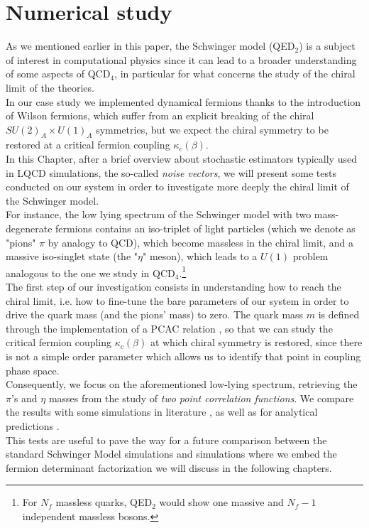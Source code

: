 \chapter{Numerical study}
\label{chap: Std Schwinger Model}

As we mentioned earlier in this paper, the Schwinger model (QED$_2$) is a subject of interest in computational physics since it can lead to a broader understanding of some aspects of QCD$_4$, in particular for what concerns the study of the chiral limit of the theories. 
\\ In our case study we implemented dynamical fermions thanks to the introduction of Wilson fermions, which suffer from an explicit breaking of the chiral $SU(2)_A \times U(1)_A$ symmetries, but we expect the chiral symmetry to be restored at a critical fermion coupling $\kappa_c(\beta).$
\\ In this Chapter, after a brief overview about stochastic estimators typically used in LQCD simulations, the so-called \textit{noise vectors}, we will present some tests conducted on our system in order to investigate more deeply the chiral limit of the Schwinger model.
\\ For instance, the low lying spectrum of the Schwinger model with two mass-degenerate fermions contains an iso-triplet of light particles (which we denote as "pions" $\pi$ by analogy to QCD), which become massless in the chiral limit, and a massive iso-singlet state (the "$\eta$" meson), which leads to a $U(1)$ problem analogous to the one we study in QCD$_4$.\footnote{For $N_f$ massless quarks, QED$_2$ would show one massive and $N_f - 1$ independent massless bosons.}
\\ The first step of our investigation consists in understanding how to reach the chiral limit, i.e. how to fine-tune the bare parameters of our system in order to drive the quark mass (and the pions' mass) to zero. The quark mass $m$ is defined through the implementation of a PCAC relation \cite{Hip_1998}, so that we can study the critical fermion coupling $\kappa_c(\beta)$ at which chiral symmetry is restored, since there is not a simple order parameter which allows us to identify that point in coupling phase space.
\\ Consequently, we focus on the aforementioned low-lying spectrum, retrieving the $\pi$'s and $\eta$ masses from the study of \textit{two point correlation functions}. We compare the results with some simulations in literature \cite{Hip_1998, Gattringer_1999, Christian_2006, https://doi.org/10.48550/arxiv.2201.08008}, as well as for analytical predictions \cite{BELVEDERE1979112, https://doi.org/10.48550/arxiv.hep-th/9505168, Hosotani_1998}.
\\ This tests are useful to pave the way for a future comparison between the standard Schwinger Model simulations and simulations where we embed the fermion determinant factorization we will discuss in the following chapters.


